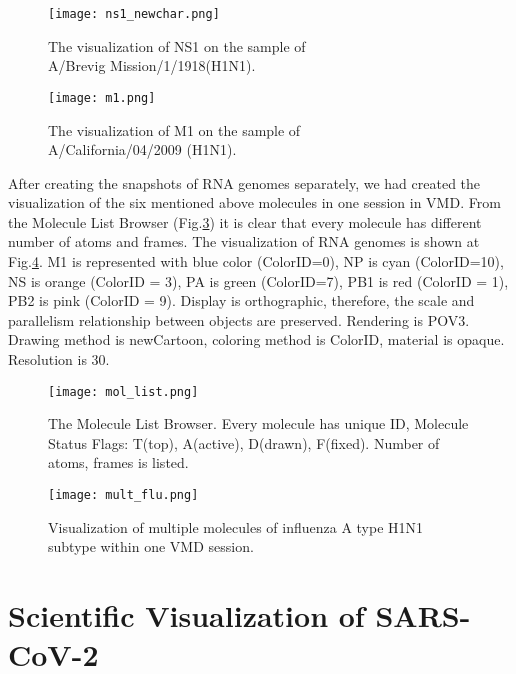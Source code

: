 \documentclass[conference]{IEEEtran}
\begin{document}
\begin{figure}[htbp]
    \centerline{\texttt{[image: ns1\_newchar.png]}}
\caption{The visualization of NS1 on the sample of \\ A/Brevig Mission/1/1918(H1N1).  }
\label{fig:ns1_flu}
\end{figure}

\begin{figure}[htbp]
    \centerline{\texttt{[image: m1.png]}}
\caption{The visualization of M1 on the sample of\\ A/California/04/2009 (H1N1).  }
\label{fig:m1_flu}
\end{figure}

After creating the snapshots of RNA genomes separately, we had created the visualization of the six mentioned above molecules in one session in VMD. From the Molecule List Browser (Fig.\ref{fig:mol_flu}) it is clear that every molecule has different number of atoms and frames. The visualization of RNA genomes is shown at Fig.\ref{fig:mult_flu}.  M1 is represented with blue color (ColorID=0), NP is cyan (ColorID=10), NS is orange (ColorID = 3), PA is green (ColorID=7), PB1 is red (ColorID = 1), PB2 is pink (ColorID = 9). Display is orthographic, therefore, the scale and parallelism relationship between objects are preserved. Rendering is POV3. Drawing method is newCartoon, coloring method is ColorID, material is opaque. Resolution is 30.

\begin{figure}[htbp]
    \centerline{\texttt{[image: mol\_list.png]}}
\caption{The Molecule List Browser. Every molecule has unique ID, Molecule Status Flags: T(top), A(active), D(drawn), F(fixed). Number of atoms, frames is listed.}
\label{fig:mol_flu}
\end{figure}

\begin{figure}[htbp]
    \centerline{\texttt{[image: mult\_flu.png]}}
\caption{Visualization of multiple molecules of influenza A type H1N1 subtype within one VMD session. }
\label{fig:mult_flu}
\end{figure}


\section{Scientific Visualization of SARS-CoV-2}
\end{document}

